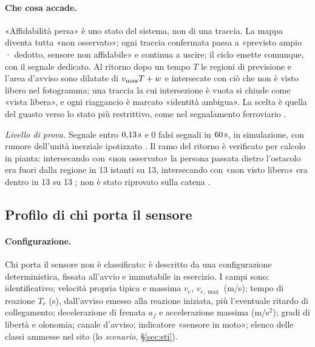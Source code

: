 \paragraph{Che cosa accade.} «Affidabilità persa» è uno stato del sistema, non di una traccia. La mappa diventa tutta «non osservato»; ogni traccia confermata passa a «previsto ampio · dedotto, sensore non affidabile» e continua a uscire; il ciclo emette comunque, con il segnale dedicato. Al ritorno dopo un tempo $T$ le regioni di previsione e l'area d'avviso sono dilatate di $v_{\max} T+w$ e intersecate con ciò che non è visto libero nel fotogramma; una traccia la cui intersezione è vuota si chiude come «vista libera», e ogni riaggancio è marcato «identità ambigua». La scelta è quella del guasto verso lo stato più restrittivo, come nel segnalamento ferroviario \cite{us-49cfr-236-205}.

\emph{Livello di prova.} Segnale entro $0{,}13\,\mathrm{s}$ e 0 falsi segnali in $60\,\mathrm{s}$, in simulazione, con rumore dell'unità inerziale ipotizzato . Il ramo del ritorno è verificato per calcolo in pianta: intersecando con «non osservato» la persona passata dietro l'ostacolo era fuori dalla regione in 13 istanti su 13, intersecando con «non visto libero» era dentro in 13 su 13 ; non è stato riprovato sulla catena .

\subsection{Profilo di chi porta il sensore}\label{sec:lim-portatore}

\paragraph{Configurazione.} Chi porta il sensore non è classificato: è descritto da una configurazione deterministica, fissata all'avvio e immutabile in esercizio. I campi sono: identificativo; velocità propria tipica e massima $v_e$, $v_{e,\max}$ (m/s); tempo di reazione $T_r$ (s), dall'avviso emesso alla reazione iniziata, più l'eventuale ritardo di collegamento; decelerazione di frenata $a_f$ e accelerazione massima (m/s$^2$); gradi di libertà e olonomia; canale d'avviso; indicatore «sensore in moto»; elenco delle classi ammesse nel sito (lo \emph{scenario}, \S\ref{sec:sti}).

